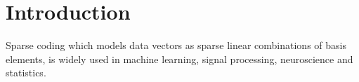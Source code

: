 \section{Introduction}
\label{sec:Introduction}
Sparse coding which models data vectors as sparse linear combinations of basis elements, is widely used in machine learning, signal processing, neuroscience and statistics.
